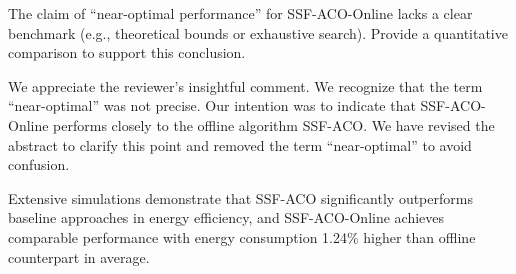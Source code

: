 \begin{revcomment}
	The claim of ``near-optimal performance'' for SSF-ACO-Online lacks a clear benchmark (e.g., theoretical bounds or exhaustive search). Provide a quantitative comparison to support this conclusion.
\end{revcomment}
\begin{revresponse}
	We appreciate the reviewer's insightful comment.
	We recognize that the term ``near-optimal'' was not precise. Our intention was to indicate that SSF-ACO-Online performs closely to the offline algorithm SSF-ACO. We have revised the abstract to clarify this point and removed the term ``near-optimal'' to avoid confusion.
	\begin{changes}
		Extensive simulations demonstrate that SSF-ACO significantly outperforms baseline approaches in energy efficiency, and SSF-ACO-Online achieves comparable performance with energy consumption 1.24\% higher than offline counterpart in average.
	\end{changes}
\end{revresponse}

